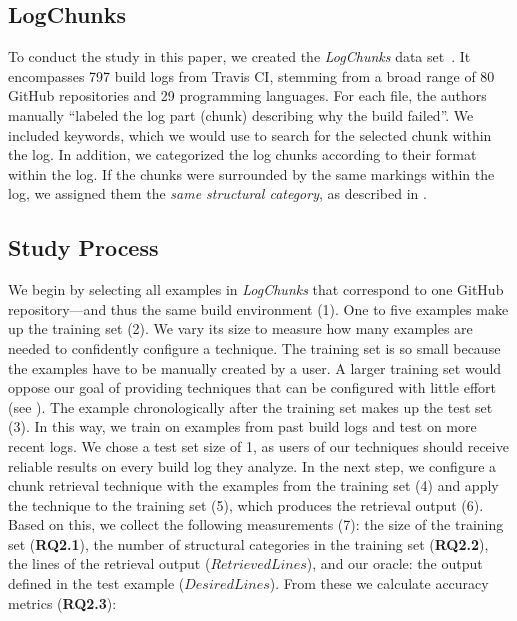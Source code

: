 \subsection{LogChunks}
To conduct the study in this paper, we created the 
\emph{LogChunks}  data set~\cite{brandt2020logchunks}.
It encompasses 797 build logs from Travis CI,
stemming from a broad range of 80 GitHub repositories and 29
programming languages.
For each file, the authors manually ``labeled
the log part (chunk) describing why the build
failed''.
We included keywords, which we
would use to search for the selected chunk within the log.
In
addition, we categorized the log chunks according to their format
within the log.
If the chunks were surrounded by the same markings
within the log, we assigned them the \emph{same structural category},
as described in .

\subsection{Study Process}
We begin by selecting all examples in \emph{LogChunks}
that correspond to one GitHub repository---and thus the
same build environment (1).
One to five examples make up the training set (2).
We vary its size to measure how many examples are needed to
confidently configure a technique.
The training set is so small because the examples have to be
manually created by a user.
A larger training set would oppose our goal of providing techniques
that can be configured with little effort
(see ).
The example chronologically after the training set makes up the
test set (3).
In this way, we train on examples from past build logs and test on
more recent logs.
We chose a test set size of 1, as users of our techniques
should receive reliable results on every build log they analyze.
In the next step, we configure a chunk retrieval technique with
the examples from the training set (4) and apply the technique to the
training set (5), which produces the retrieval output (6).
Based on this, we collect the following measurements (7):
the size of the training set (\textbf{RQ2.1}),
the number of structural categories in the training
set (\textbf{RQ2.2}),
the lines of the retrieval output ($\mathit{RetrievedLines}$),
and our oracle: the output defined in the test example
($\mathit{DesiredLines}$).
From these we calculate accuracy metrics (\textbf{RQ2.3}):


